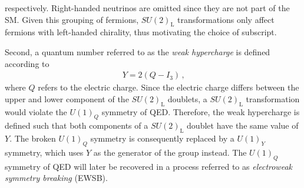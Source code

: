 respectively. %
Right-handed neutrinos are omitted since they are not part of the SM.
Given this grouping of fermions, $SU(2)_{\text{L}}$ transformations only affect
fermions with left-handed chirality, thus motivating the choice of subscript.

Second, a quantum number referred to as the \emph{weak hypercharge} is defined
according to
\begin{align*}
  Y = 2 (Q - I_3) \,\text{,}
\end{align*}
where $Q$ refers to the electric charge. Since the electric charge differs
between the upper and lower component of the $SU(2)_{\text{L}}$ doublets, a
$SU(2)_{\text{L}}$ transformation would violate the $U(1)_Q$ symmetry of
QED. Therefore, the weak hypercharge is defined such that both components of a
$SU(2)_{\text{L}}$ doublet have the same value of $Y$. The broken $U(1)_Q$
symmetry is consequently replaced by a $U(1)_Y$ symmetry, which uses $Y$ as the
generator of the group instead. The $U(1)_Q$ symmetry of QED will later be
recovered in a process referred to as \emph{electroweak symmetry breaking}
(EWSB).

